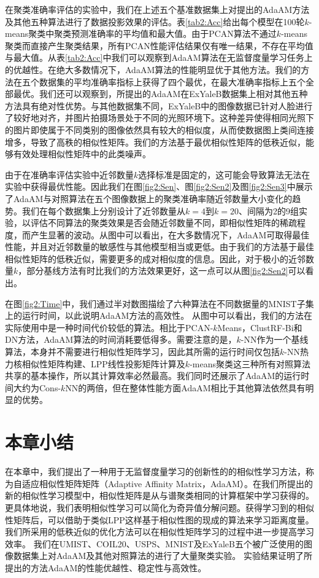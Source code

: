 在聚类准确率评估的实验中，我们在上述五个基准数据集上对提出的AdaAM方法及其他五种算法进行了数据投影效果的评估。表\ref{tab2:Acc}给出每个模型在100轮$k$-means聚类中聚类预测准确率的平均值和最大值。由于PCAN算法不通过$k$-means聚类而直接产生聚类结果，所有PCAN性能评估结果仅有唯一结果，不存在平均值与最大值。从表\ref{tab2:Acc}中我们可以观察到AdaAM算法在无监督度量学习任务上的优越性。在绝大多数情况下，AdaAM算法的性能明显优于其他方法。我们的方法在五个数据集的平均准确率指标上获得了四个最优，在最大准确率指标上五个全部最优。我们还可以观察到，所提出的AdaAM在ExYaleB数据集上相对其他五种方法具有绝对性优势。与其他数据集不同，ExYaleB中的图像数据已针对人脸进行了较好地对齐，并图片拍摄场景处于不同的光照环境下。这种差异使得相同光照下的图片即使属于不同类别的图像依然具有较大的相似度，从而使数据图上类间连接增多，导致了高秩的相似性矩阵。我们的方法基于最优相似性矩阵的低秩近似，能够有效处理相似性矩阵中的此类噪声。

由于在准确率评估实验中近邻数量$k$选择标准是固定的，这可能会导致算法无法在实验中获得最优性能。因此我们在图\ref{fig2:Sen}、图\ref{fig2:Sen2}及图\ref{fig2:Sen3}中展示了AdaAM与对照算法在五个图像数据上的聚类准确率随近邻数量大小变化的趋势。我们在每个数据集上分别设计了近邻数量从$k=4$到$k=20$、间隔为2的9组实验，以评估不同算法的聚类效果是否会随近邻数量不同，即相似性矩阵的稀疏程度，而产生显著的波动。从图中可以看出，在大多数情况下，AdaAM可取得最佳性能，并且对近邻数量的敏感性与其他模型相当或更低。由于我们的方法基于最佳相似性矩阵的低秩近似，需要更多的成对相似度的信息。因此，对于极小的近邻数量$k$，部分基线方法有时比我们的方法效果更好，这一点可以从图\ref{fig2:Sen2}可以看出。

在图\ref{fig2:Time}中，我们通过半对数图描绘了六种算法在不同数据量的MNIST子集上的运行时间，以此说明AdaAM方法的高效性。 从图中可以看出，我们的方法在实际使用中是一种时间代价较低的算法。相比于PCAN-$k$Means，ClustRF-Bi和DN方法，AdaAM算法的时间消耗要低得多。需要注意的是，$k$-NN作为一个基线算法，本身并不需要进行相似性矩阵学习，因此其所需的运行时间仅包括$k$-NN热力核相似性矩阵构建、LPP线性投影矩阵计算及$k$-means聚类这三种所有对照算法共享的基本操作，所以其计算效率必然最高。我们同时还展示了AdaAM的运行时间大约为Cons-$k$NN的两倍，但在整体性能方面AdaAM相比于其他算法依然具有明显的优势。

\section{本章小结}
在本章中，我们提出了一种用于无监督度量学习的创新性的的相似性学习方法，称为自适应相似性矩阵矩阵（Adaptive Affinity Matrix，AdaAM）。在我们所提出的新的相似性学习模型中，相似性矩阵是从与谱聚类相同的计算框架中学习获得的。 更具体地说，我们表明相似性学习可以简化为奇异值分解问题。获得学习到的相似性矩阵后，可以借助于类似LPP这样基于相似性图的现成的算法来学习距离度量。我们所采用的低秩近似的优化方法可以在相似性矩阵学习的过程中进一步提高学习效率。
我们在UMIST、COIL20、USPS、MNIST及ExYaleB五个被广泛使用的图像数据集上对AdaAM及其他对照算法的进行了大量聚类实验。
实验结果证明了所提出的方法AdaAM的性能优越性、稳定性与高效性。